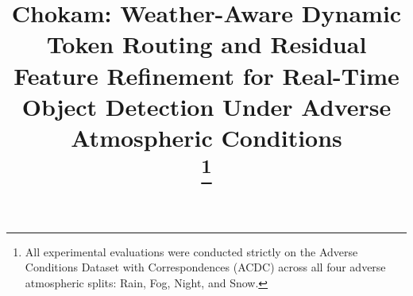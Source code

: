 \documentclass[conference]{IEEEtran}
\begin{document}
\title{Chokam: Weather-Aware Dynamic Token Routing and Residual Feature Refinement for Real-Time Object Detection Under Adverse Atmospheric Conditions\\
\thanks{All experimental evaluations were conducted strictly on the Adverse Conditions Dataset with Correspondences (ACDC) across all four adverse atmospheric splits: Rain, Fog, Night, and Snow.}
}

\author{
}

\maketitle
\end{document}
